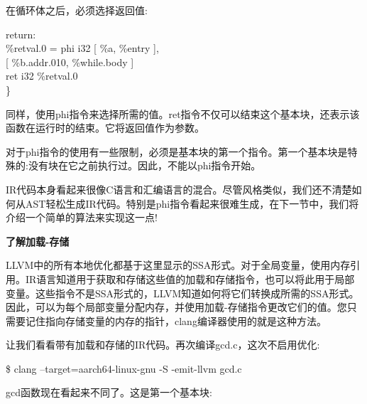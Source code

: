 在循环体之后，必须选择返回值:\par

\begin{tcolorbox}[colback=white,colframe=black]
return: \\
\hspace*{0.5cm}\%retval.0 = phi i32 [ \%a, \%entry ], \\
\hspace*{3.5cm}[ \%b.addr.010, \%while.body ] \\
\hspace*{0.5cm}ret i32 \%retval.0 \\
\}
\end{tcolorbox}

同样，使用phi指令来选择所需的值。ret指令不仅可以结束这个基本块，还表示该函数在运行时的结束。它将返回值作为参数。\par

对于phi指令的使用有一些限制，必须是基本块的第一个指令。第一个基本块是特殊的:没有块在它之前执行过。因此，不能以phi指令开始。\par

IR代码本身看起来很像C语言和汇编语言的混合。尽管风格类似，我们还不清楚如何从AST轻松生成IR代码。特别是phi指令看起来很难生成，在下一节中，我们将介绍一个简单的算法来实现这一点!\par

\hspace*{\fill} \par %
\textbf{了解加载-存储}

LLVM中的所有本地优化都基于这里显示的SSA形式。对于全局变量，使用内存引用。IR语言知道用于获取和存储这些值的加载和存储指令，也可以将此用于局部变量。这些指令不是SSA形式的，LLVM知道如何将它们转换成所需的SSA形式。因此，可以为每个局部变量分配内存，并使用加载-存储指令更改它们的值。您只需要记住指向存储变量的内存的指针，clang编译器使用的就是这种方法。\par

让我们看看带有加载和存储的IR代码。再次编译gcd.c，这次不启用优化:\par

\begin{tcolorbox}[colback=white,colframe=black]
\$ clang --target=aarch64-linux-gnu -S -emit-llvm gcd.c
\end{tcolorbox}

gcd函数现在看起来不同了。这是第一个基本块:\par


